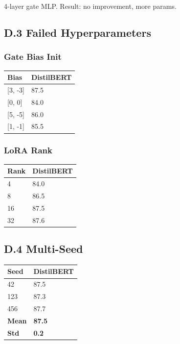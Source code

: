 4-layer gate MLP. Result: no improvement, more params.

\subsection{D.3 Failed Hyperparameters}

\subsubsection{Gate Bias Init}

\begin{table}[H]
\centering
\small
\begin{tabular}{ll}
\toprule
\textbf{Bias} & \textbf{DistilBERT} \\
\midrule
{[3, -3]} & 87.5 \\
{[0, 0]} & 84.0 \\
{[5, -5]} & 86.0 \\
{[1, -1]} & 85.5 \\
\bottomrule
\end{tabular}
\end{table}

\subsubsection{LoRA Rank}

\begin{table}[H]
\centering
\small
\begin{tabular}{ll}
\toprule
\textbf{Rank} & \textbf{DistilBERT} \\
\midrule
4 & 84.0 \\
8 & 86.5 \\
16 & 87.5 \\
32 & 87.6 \\
\bottomrule
\end{tabular}
\end{table}

\subsection{D.4 Multi-Seed}

\begin{table}[H]
\centering
\small
\begin{tabular}{ll}
\toprule
\textbf{Seed} & \textbf{DistilBERT} \\
\midrule
42 & 87.5 \\
123 & 87.3 \\
456 & 87.7 \\
\textbf{Mean} & \textbf{87.5} \\
\textbf{Std} & \textbf{0.2} \\
\bottomrule
\end{tabular}
\end{table}

